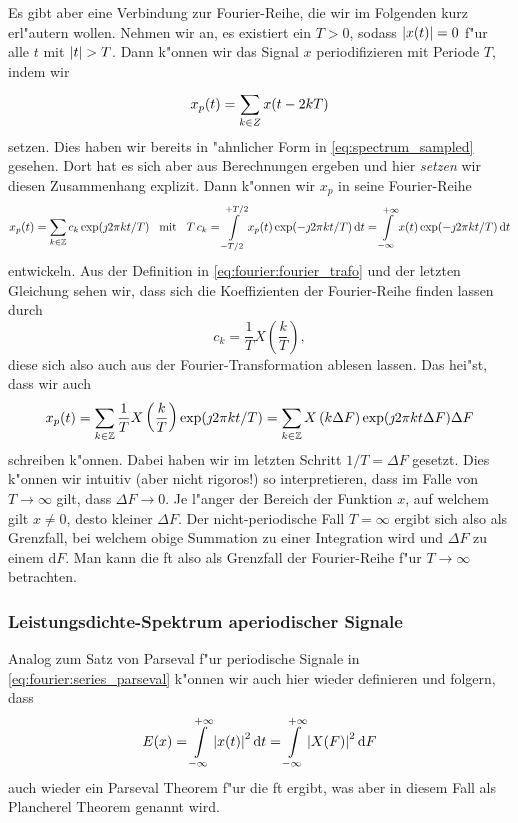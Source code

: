 Es gibt aber eine Verbindung zur Fourier-Reihe, die wir im Folgenden kurz erl"autern wollen.
Nehmen wir an, es existiert ein $T > 0$, sodass ${\left| x(t) \right|} = 0$ f"ur alle $t$ mit ${\left| t \right|} > T$.
Dann k"onnen wir das Signal $x$ periodifizieren mit Periode $T$, indem wir
\[
x_p(t) = {\sum\limits_{k \in Z}^{}{x(t - 2kT)}}
\]
setzen.
Dies haben wir bereits in "ahnlicher Form in \eqref{eq:spectrum_sampled} gesehen. 
Dort hat es sich aber aus Berechnungen ergeben und hier \emph{setzen} wir diesen Zusammenhang explizit.
Dann k"onnen wir $x_p$ in seine Fourier-Reihe 
\[
x_p(t) = {\sum\limits_{k \in \mathbb{Z}}^{}{c_k \exp(\jmath 2 \pi k t/T)}}
{\hspace{3mm} \text{mit} \hspace{3mm}}
T\,c_k = {\int\limits_{-T/2}^{+T/2}{x_p(t) \exp(- \jmath 2 \pi k t/T)}\,\mathrm{d}{t}}
    = {\int\limits_{-\infty}^{+\infty}{x(t) \exp(- \jmath 2 \pi k t/T)}\,\mathrm{d}{t}}
\]
entwickeln.
Aus der Definition in \eqref{eq:fourier:fourier_trafo} und der letzten Gleichung sehen wir, dass sich die Koeffizienten der Fourier-Reihe finden lassen durch
\begin{equation}\label{eq:fourier:c_k_fourier}
    c_k = \frac 1T X\left(\frac kT\right),
\end{equation}
diese sich also auch aus der Fourier-Transformation ablesen lassen.
Das hei"st, dass wir auch
\[
x_p(t) = {\sum\limits_{k \in \mathbb{Z}}^{}{\frac 1T X\left(\frac kT\right) \exp(\jmath 2 \pi k t/T)}}
       = {\sum\limits_{k \in \mathbb{Z}}^{}{X\left(k \Delta F\right) \exp(\jmath 2 \pi k t \Delta F) \Delta F}}
\]
schreiben k"onnen.
Dabei haben wir im letzten Schritt $1/T = \Delta F$ gesetzt.
Dies k"onnen wir intuitiv (aber nicht rigoros!) so interpretieren, dass im Falle von $T \rightarrow \infty$ gilt, dass $\Delta F \rightarrow 0$.
Je l"anger der Bereich der Funktion $x$, auf welchem gilt $x \neq 0$, desto kleiner $\Delta F$.
Der nicht-periodische Fall $T = \infty$ ergibt sich also als Grenzfall, bei welchem obige Summation zu einer Integration wird und $\Delta F$ zu einem $\mathrm{d}F$.
Man kann die \acrlong{ft} also als Grenzfall der Fourier-Reihe f"ur $T \rightarrow \infty$ betrachten.
%
%
\subsubsection{Leistungsdichte-Spektrum aperiodischer Signale}
%
Analog zum Satz von Parseval f"ur periodische Signale in \eqref{eq:fourier:series_parseval} k"onnen wir auch hier wieder definieren und folgern, dass
\begin{equation}
E(x) = {\int\limits_{-\infty}^{+\infty}{{\left| x(t) \right|}^2}\,\mathrm{d}{t}}
     = {\int\limits_{-\infty}^{+\infty}{{\left| X(F) \right|}^2}\,\mathrm{d}{F}}
\end{equation}
auch wieder ein Parseval Theorem f"ur die \acrlong{ft} ergibt, was aber in diesem Fall als Plancherel Theorem genannt wird.

